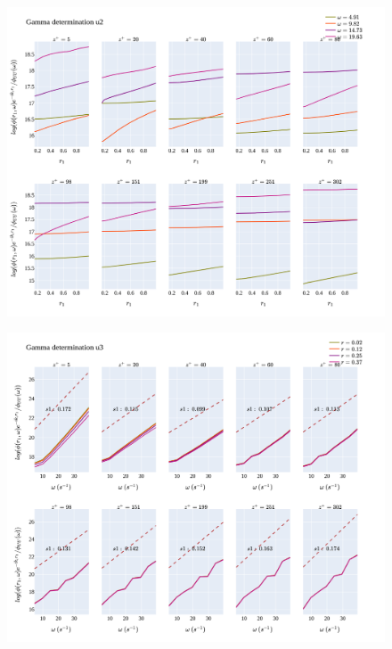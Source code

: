 \documentclass[]{article}
\theoremstyle{plain}
\theoremstyle{remark}
\begin{document}
\begin{figure}[H]
	\begin{center}
		\includegraphics[width=\textwidth]{../../output/figures/channel_wrles_retau395/split_time/gamma/gamma_u2_r_all.png}
	\end{center}
\end{figure}

\begin{figure}[H]
	\begin{center}
		\includegraphics[width=\textwidth]{../../output/figures/channel_wrles_retau395/split_time/gamma/gamma_u3_w_all.png}

	\end{center}
\end{figure}
\end{document}
